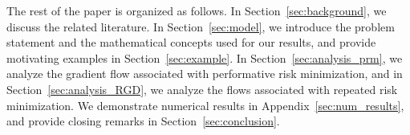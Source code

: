 The rest of the paper is organized as follows. In Section~\ref{sec:background}, we discuss the related literature. In Section~\ref{sec:model}, we introduce the problem statement and the mathematical concepts used for our results, and provide motivating examples in Section~\ref{sec:example}. In Section~\ref{sec:analysis_prm}, we analyze the gradient flow associated with performative risk minimization, and in Section~\ref{sec:analysis_RGD}, we analyze the flows associated with repeated risk minimization. We demonstrate numerical results in Appendix~\ref{sec:num_results}, and provide closing remarks in Section~\ref{sec:conclusion}.
